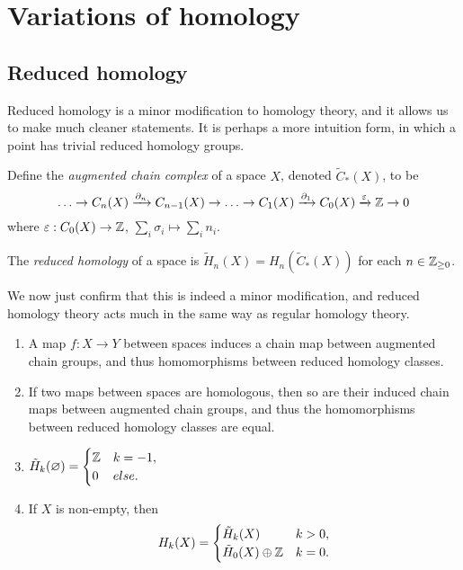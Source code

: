 \section{Variations of homology}

\subsection{Reduced homology}

Reduced homology is a minor modification to homology theory, and it allows us to make much cleaner statements. It is perhaps a more intuition form, in which a point has trivial reduced homology groups.

\begin{definition}
  Define the \emph{augmented chain complex} of a space $X$, denoted $\tilde C_*(X)$, to be
  \[\ldots \to C_n(X) \xrightarrow[]{\partial_n} C_{n-1}(X) \to \ldots \to C_{1}(X) \xrightarrow[]{\partial_1} C_0(X) \xrightarrow[]{\varepsilon} \mathbb{Z} \to 0\]
  where $\varepsilon: C_0(X) \to \mathbb{Z}$, $\sum_i\sigma_i \mapsto \sum_in_i$.
\end{definition}

\begin{definition}
  The \emph{reduced homology} of a space is $\tilde H_n(X) = H_n(\tilde C_*(X))$ for each $n \in \mathbb{Z}_{\geq 0}$.
\end{definition}

We now just confirm that this is indeed a minor modification, and reduced homology theory acts much in the same way as regular homology theory.

\begin{proposition}
  \begin{enumerate}
    \item A map $f: X \to Y$ between spaces induces a chain map between augmented chain groups, and thus homomorphisms bet\-ween reduced homology classes.
    \item If two maps between spaces are homologous, then so are their induced chain maps between augmented chain groups, and thus the homomorphisms between reduced homology classes are equal.
    \item $\tilde H_k(\varnothing) = \begin{cases}
              \mathbb{Z} & k = -1, \\
              0  & else.
            \end{cases}$
    \item If $X$ is non-empty, then
          \[H_k(X) = \begin{cases}
              \tilde H_k(X)           & k > 0, \\
              \tilde H_0(X) \oplus \mathbb{Z} & k = 0.
            \end{cases}\]
  \end{enumerate}
\end{proposition}


